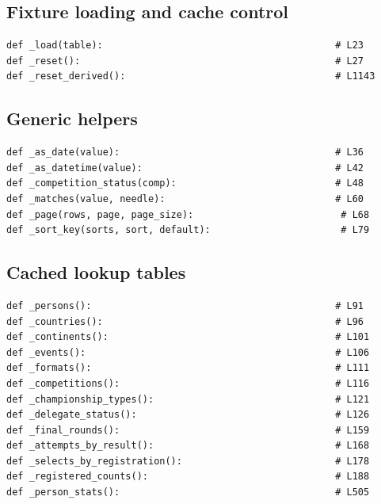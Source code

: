 \documentclass[11pt,a4paper]{article}
\begin{document}
\subsection*{Fixture loading and cache control}
\begin{lstlisting}
def _load(table):                                         # L23
def _reset():                                             # L27
def _reset_derived():                                     # L1143
\end{lstlisting}

\subsection*{Generic helpers}
\begin{lstlisting}
def _as_date(value):                                      # L36
def _as_datetime(value):                                  # L42
def _competition_status(comp):                            # L48
def _matches(value, needle):                              # L60
def _page(rows, page, page_size):                          # L68
def _sort_key(sorts, sort, default):                       # L79
\end{lstlisting}

\subsection*{Cached lookup tables}
\begin{lstlisting}
def _persons():                                           # L91
def _countries():                                         # L96
def _continents():                                        # L101
def _events():                                            # L106
def _formats():                                           # L111
def _competitions():                                      # L116
def _championship_types():                                # L121
def _delegate_status():                                   # L126
def _final_rounds():                                      # L159
def _attempts_by_result():                                # L168
def _selects_by_registration():                           # L178
def _registered_counts():                                 # L188
def _person_stats():                                      # L505
\end{lstlisting}
\end{document}
